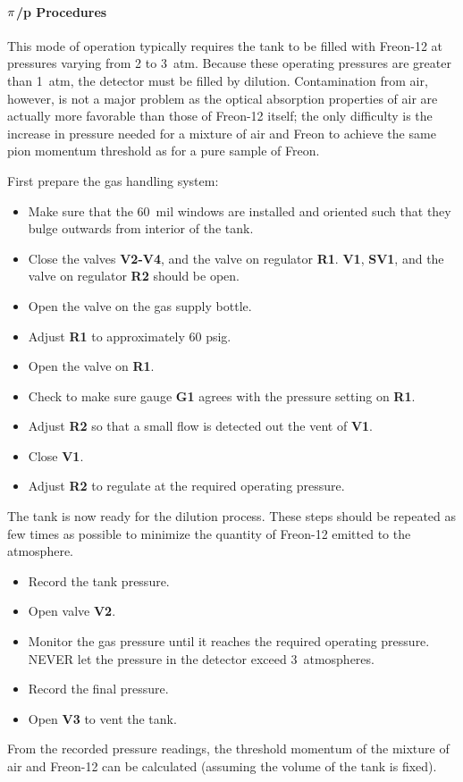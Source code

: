 \paragraph{$\bf{\pi}$/p Procedures}
This mode of operation typically requires the tank to be filled with Freon-12
at pressures varying from 2 to 3~atm.  Because these operating pressures are
greater than 1~atm, the detector must be filled by dilution.  Contamination
from air, however, is not a major problem as the optical absorption properties
of air are actually more favorable than those of Freon-12 itself; the only
difficulty is the increase in pressure needed for a mixture of air and Freon
to achieve the same pion momentum threshold as for a pure sample of Freon.

First prepare the gas handling system:
\begin{itemize}
\item Make sure that the 60~mil windows are installed and oriented such that
they bulge outwards from interior of the tank.
\item Close the valves {\bf V2-V4}, and the valve on regulator {\bf R1}.
{\bf V1}, {\bf SV1}, and the valve on regulator {\bf R2} should be
open.
\item Open the valve on the gas supply bottle.
\item Adjust {\bf R1} to approximately 60 psig.
\item Open the valve on {\bf R1}.
\item Check to make sure gauge {\bf G1} agrees with the pressure setting
on {\bf R1}.
\item Adjust {\bf R2} so that a small flow is detected out the vent of
{\bf V1}.
\item Close {\bf V1}.
\item Adjust {\bf R2} to regulate at the required operating pressure.
\end{itemize}
The tank is now ready for the dilution process.  These steps should be
repeated as few times as possible to minimize the quantity of Freon-12 emitted
to the atmosphere.
\begin{itemize}
\item Record the tank pressure.
\item Open valve {\bf V2}.
\item Monitor the gas pressure until it reaches the required operating pressure.
NEVER let the pressure in the detector exceed 3~atmospheres.
\item Record the final pressure.
\item Open {\bf V3} to vent the tank.
\end{itemize}
From the recorded pressure readings, the threshold momentum of the mixture
of air and Freon-12 can be calculated (assuming the volume of the tank is
fixed).



